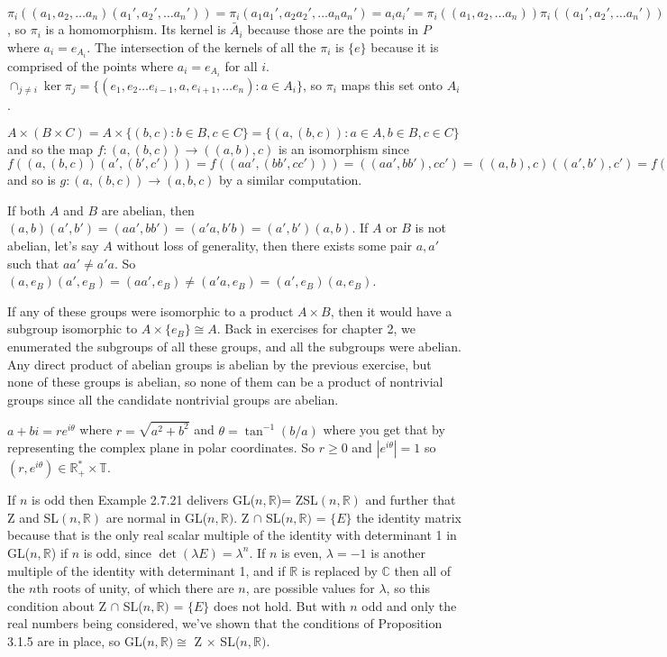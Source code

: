 \documentclass[11pt, oneside]{article}   	%
\newcommand{\reals}{\mathbb{R}}
\newcommand{\comps}{\mathbb{C}}
\newcommand{\inv}{^{-1}}
\newcommand{\ra}{\rightarrow}
\newcommand{\tai}{\tilde{A_i}}
\begin{document}
$\pi_i((a_1, a_2, \ldots a_n)(a_1', a_2', \ldots a_n')) = \pi_i(a_1a_1', a_2a_2', \ldots a_na_n') = a_ia_i' = \pi_i((a_1, a_2, \ldots a_n))\pi_i((a_1', a_2', \ldots a_n'))$, so $\pi_i$ is a homomorphism. Its kernel is $\tai$ because those are the points in $P$ where $a_i = e_{A_i}$. The intersection of the kernels of all the $\pi_i$ is $\{e\}$ because it is comprised of the points where $a_i = e_{A_i}$ for all $i$. $\cap_{j \not= i}\ker{\pi_j} = \{(e_1, e_2 \ldots e_{i-1}, a, e_{i+1}, \ldots e_n) : a \in A_i \}$, so $\pi_i$ maps this set onto $A_i$.
\item $A \times (B \times C) = A \times \{ (b, c) : b \in B, c \in C\} = \{(a, (b, c)) : a \in A, b \in B, c \in C\}$ and so the map $f: (a, (b, c)) \ra ((a, b), c)$ is an isomorphism since $f((a, (b, c))(a', (b', c'))) = f((aa', (bb', cc'))) = ((aa', bb'), cc') = ((a, b), c)((a', b'), c') = f((a, (b, c)))f((a', (b', c')))$ and so is $g: (a, (b, c)) \ra (a, b, c)$ by a similar computation. 
\item If both $A$ and $B$ are abelian, then $(a, b)(a', b') = (aa', bb') = (a'a, b'b) = (a', b')(a, b)$. If $A$ or $B$ is not abelian, let's say $A$ without loss of generality, then there exists some pair $a, a'$ such that $aa' \not = a'a$. So $(a, e_B)(a', e_B) = (aa', e_B) \not= (a'a, e_B) = (a', e_B)(a, e_B)$.
\item If any of these groups were isomorphic to a product $A \times B$, then it would have a subgroup isomorphic to $A \times \{e_B\} \cong A$. Back in exercises for chapter 2, we enumerated the subgroups of all these groups, and all the subgroups were abelian. Any direct product of abelian groups is abelian by the previous exercise, but none of these groups is abelian, so none of them can be a product of nontrivial groups since all the candidate nontrivial groups are abelian.
\item $a + bi = re^{i\theta}$ where $r = \sqrt{a^2 + b^2}$ and $\theta = \tan\inv(b/a)$ where you get that by representing the complex plane in polar coordinates. So $r \ge 0$ and $|e^{i\theta}| = 1$ so $(r, e^{i\theta}) \in \reals_+^* \times \mathbb{T}$. 
\item If $n$ is odd then Example 2.7.21 delivers GL($n, \reals$)= ZSL$(n, \reals)$ and further that Z and SL$(n, \reals)$ are normal in GL($n, \reals)$. Z $\cap$ SL($n, \reals)$ = $\{E\}$ the identity matrix because that is the only real scalar multiple of the identity with determinant 1 in GL($n, \reals$) if $n$ is odd, since $\det(\lambda E) = \lambda^n$. If $n$ is even, $\lambda = -1$ is another multiple of the identity with determinant 1, and if $\reals$ is replaced by $\comps$ then all of the $n$th roots of unity, of which there are $n$, are possible values for $\lambda$, so this condition about Z $\cap$ SL($n, \reals)$ = $\{E\}$ does not hold. But with $n$ odd and only the real numbers being considered, we've shown that the conditions of Proposition 3.1.5 are in place, so GL($n, \reals) \cong $ Z $\times $ SL($n, \reals)$.
\end{document}
